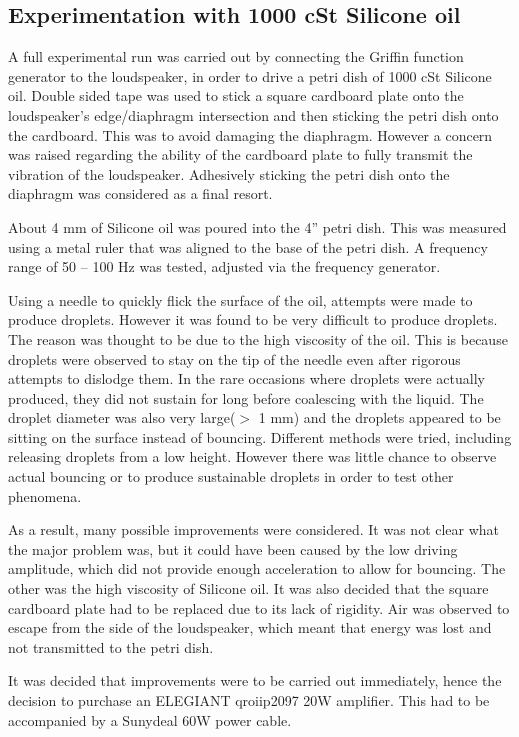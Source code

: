 \subsection{Experimentation with 1000 cSt Silicone oil}
A full experimental run  was carried out by connecting the Griffin function generator to the loudspeaker, in order to drive a petri dish of 1000 cSt Silicone oil. Double sided tape was used to stick a square cardboard plate onto the loudspeaker's edge/diaphragm intersection and then sticking the petri dish onto the cardboard. This was to avoid damaging the diaphragm. However a concern was raised regarding the ability of the cardboard plate to fully transmit the vibration of the loudspeaker. Adhesively sticking the petri dish onto the diaphragm was considered as a final resort.

About 4 mm of Silicone oil was poured into the 4'' petri dish. This was measured using a metal ruler that was aligned to the base of the petri dish. A frequency range of 50 -- 100 Hz was tested, adjusted via the frequency generator.

Using a needle to quickly flick the surface of the oil, attempts were made to produce droplets. However it was found to be very difficult to produce droplets. The reason was thought to be due to the high viscosity of the oil. This is because droplets were observed to stay on the tip of the needle even after rigorous attempts to dislodge them. In the rare occasions where droplets were actually produced, they did not sustain for long before coalescing with the liquid. The droplet diameter was also very large($>$ 1 mm) and the droplets appeared to be sitting on the surface instead of bouncing. Different methods were tried, including releasing droplets from a low height. However there was little chance to observe actual bouncing or to produce sustainable droplets in order to test other phenomena.

As a result,  many possible improvements were considered. It was not clear what the major problem was, but it  could have been caused by the low driving amplitude, which did not provide enough acceleration to allow for bouncing. The other was the high viscosity of Silicone oil. It was also decided that the square cardboard plate had to be replaced due to its lack of rigidity. Air was observed to escape from the side of the loudspeaker, which meant that energy was lost and not transmitted to the petri dish. 

It was decided that improvements were to be carried out immediately, hence the decision to purchase an ELEGIANT qroiip2097 20W amplifier. This had to be accompanied by a Sunydeal 60W power cable.

